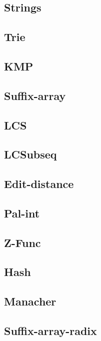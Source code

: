 \documentclass{article}
\newcommand\includes[2]{ %
   \subsection{#1}
   
}
\begin{document}
\begin{multicols}{2}
\section{Strings}
\includes{Trie}{C++/Strings/Trie.cpp}
\includes{KMP}{C++/Strings/KMP.cpp}
\includes{Suffix-array}{C++/Strings/Suffix-array.cpp}
\includes{LCS}{C++/Strings/LCS.cpp}
\includes{LCSubseq}{C++/Strings/LCSubseq.cpp}
\includes{Edit-distance}{C++/Strings/Edit-distance.cpp}
\includes{Pal-int}{C++/Strings/Pal-int.cpp}
\includes{Z-Func}{C++/Strings/Z-Func.cpp}
\includes{Hash}{C++/Strings/Hash.cpp}
\includes{Manacher}{C++/Strings/Manacher.cpp}
\includes{Suffix-array-radix}{C++/Strings/Suffix-array-radix.cpp}

\end{multicols}
\end{document}

